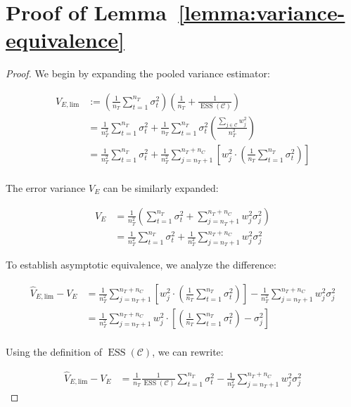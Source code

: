 \documentclass{mytemplate}
\begin{document}
\section{Proof of Lemma~\ref{lemma:variance-equivalence}}
\label{sec:proof-lemma:variance-equivalence}
\begin{proof}
We begin by expanding the pooled variance estimator:

$$
\begin{aligned}
\hat{V}_{E, \text{lim}} & :=\left(\frac{1}{n_T} \sum_{t=1}^{n_T} \sigma_t^2\right)\left(\frac{1}{n_T}+\frac{1}{\operatorname{ESS}(\mathcal{C})}\right) \\
& =\frac{1}{n_T^2} \sum_{t=1}^{n_T} \sigma_t^2+\frac{1}{n_T} \sum_{t=1}^{n_T} \sigma_t^2\left(\frac{\sum_{j \in \mathcal{C}} w_j^2}{n_T^2}\right) \\
& =\frac{1}{n_T^2} \sum_{t=1}^{n_T} \sigma_t^2+\frac{1}{n_T^2} \sum_{j=n_T+1}^{n_T+n_C}\left[w_j^2 \cdot\left(\frac{1}{n_T} \sum_{t=1}^{n_T} \sigma_t^2\right)\right] \\
\end{aligned}
$$

The error variance $V_E$ can be similarly expanded:

$$
\begin{aligned}
V_E &=\frac{1}{n_T^2}\left(\sum_{t=1}^{n_T} \sigma_t^2+\sum_{j=n_T+1}^{n_T+n_C} w_j^2 \sigma_j^2\right)\\
&=\frac{1}{n_T^2} \sum_{t=1}^{n_T} \sigma_t^2+\frac{1}{n_T^2} \sum_{j=n_T+1}^{n_T+n_C} w_j^2 \sigma_j^2
\end{aligned}
$$

To establish asymptotic equivalence, we analyze the difference:

$$
\begin{aligned} 
\hat{V}_{E, \text{lim}}-V_E &= \frac{1}{n_T^2} \sum_{j=n_T+1}^{n_T+n_C}\left[w_j^2 \cdot\left(\frac{1}{n_T} \sum_{t=1}^{n_T} \sigma_t^2\right)\right]-\frac{1}{n_T^2} \sum_{j=n_T+1}^{n_T+n_C} w_j^2 \sigma_j^2 \\ 
&= \frac{1}{n_T^2} \sum_{j=n_T+1}^{n_T+n_C} w_j^2 \cdot\left[\left(\frac{1}{n_T} \sum_{t=1}^{n_T} \sigma_t^2\right)-\sigma_j^2\right] \\ 
\end{aligned}
$$

Using the definition of $\operatorname{ESS}(\mathcal{C})$, we can rewrite:

$$
\begin{aligned}
\hat{V}_{E, \text{lim}}-V_E &= \frac{1}{n_T} \frac{1}{\operatorname{ESS}(\mathcal{C})} \sum_{t=1}^{n_T} \sigma_t^2-\frac{1}{n_T^2} \sum_{j=n_T+1}^{n_T+n_C} w_j^2 \sigma_j^2
\end{aligned}
$$


\end{proof}
\end{document}
